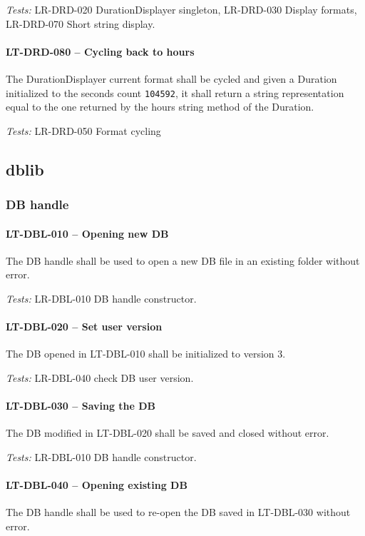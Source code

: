 \textit{Tests: } LR-DRD-020 DurationDisplayer singleton,
LR-DRD-030 Display formats, LR-DRD-070 Short string
display.

\paragraph{LT-DRD-080 -- Cycling back to hours}
The DurationDisplayer current format shall be cycled and
given a Duration initialized to the seconds count \lstinline{104592},
it shall return a string representation equal to the one returned
by the hours string method of the Duration.

\textit{Tests: } LR-DRD-050 Format cycling

\subsection{db\textunderscore lib}
\subsubsection{DB handle}
\paragraph{LT-DBL-010 -- Opening new DB}
The DB handle shall be used to open a new DB file in an existing
folder without error.

\textit{Tests: } LR-DBL-010 DB handle constructor.

\paragraph{LT-DBL-020 -- Set user version}
The DB opened in LT-DBL-010 shall be initialized to version 3.

\textit{Tests: } LR-DBL-040 check DB user version.

\paragraph{LT-DBL-030 -- Saving the DB}
The DB modified in LT-DBL-020 shall be saved and closed without error.

\textit{Tests: } LR-DBL-010 DB handle constructor.

\paragraph{LT-DBL-040 -- Opening existing DB}
The DB handle shall be used to re-open the DB saved in LT-DBL-030
without error.

